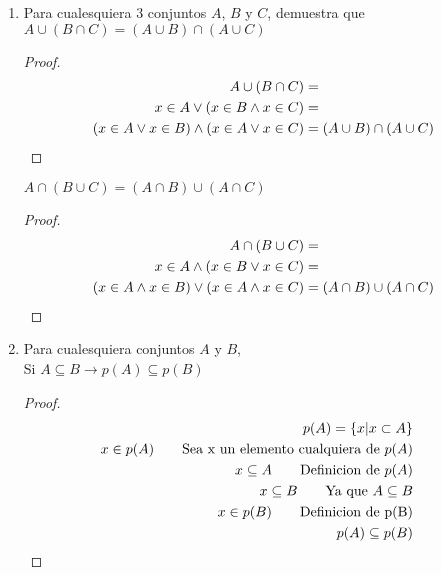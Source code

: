 \documentclass[a4paper,10pt]{article}
\begin{document}
\begin{enumerate}
 \item Para cualesquiera 3 conjuntos $A$, $B$ y $C$, demuestra que
 \\ $A \cup ( B \cap C) = (A\cup B)\cap(A\cup C) $
 \begin{proof}
  \begin{align*}
    A\cup(B\cap C) &=
    \\x\in A \lor(x\in B\land x\in C) &=
    \\(x\in A\lor x\in B)\land(x\in A\lor x\in C) &= 
    (A\cup B)\cap(A\cup C) \qedhere
  \end{align*}
 \end{proof}
 $A \cap ( B \cup C) = (A\cap B)\cup(A\cap C) $
 \begin{proof}
  \begin{align*}
    A\cap(B\cup C) &=
    \\x\in A \land(x\in B\lor x\in C) &=
    \\(x\in A\land x\in B)\lor(x\in A\land x\in C) &= 
    (A\cap B)\cup(A\cap C) \qedhere
  \end{align*}
 \end{proof}
 \item Para cualesquiera conjuntos $A$ y $B$, 
 \\ Si $A \subseteq B \to p(A) \subseteq p(B) $
 \begin{proof}
  \begin{align*}
   p(A) = \{x| x \subset A\}
   \\x\in p(A) \tag*{Sea x un elemento cualquiera de $p(A)$}
   \\x \subseteq A \tag*{Definicion de $p(A)$}
   \\x \subseteq B \tag*{Ya que $A\subseteq B$}
   \\x \in p(B) \tag*{Definicion de p(B)}
   \\ p(A)\subseteq p(B) &&\qedhere
  \end{align*}
 \end{proof}
\end{enumerate}
\end{document}
